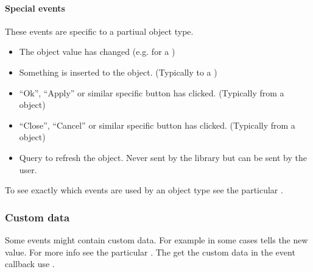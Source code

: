 \documentclass[letterpaper,10pt,english]{sphinxmanual}
\begin{document}
\paragraph{Special events}
\label{\detokenize{overview/events:special-events}}
These events are specific to a partiual object type.
\begin{itemize}
\item {} 
 The object value has changed (e.g. for a {\hyperref[\detokenize{object-types/slider::doc}]{}})

\item {} 
 Something is inserted to the object. (Typically to a {\hyperref[\detokenize{object-types/ta::doc}]{}})

\item {} 
  “Ok”, “Apply” or similar specific button has clicked. (Typically from a {\hyperref[\detokenize{object-types/kb::doc}]{}} object)

\item {} 
 “Close”, “Cancel” or similar specific button has clicked. (Typically from a {\hyperref[\detokenize{object-types/kb::doc}]{}} object)

\item {} 
 Query to refresh the object. Never sent by the library but can be sent by the user.

\end{itemize}

To see exactly which events are used by an object type see the particular {\hyperref[\detokenize{object-types/index::doc}]{}}.


\subsubsection{Custom data}
\label{\detokenize{overview/events:custom-data}}
Some events might contain custom data. For example  in some cases tells the new value. For more info see the particular {\hyperref[\detokenize{object-types/index::doc}]{}}.
The get the custom data in the event callback use .
\end{document}
